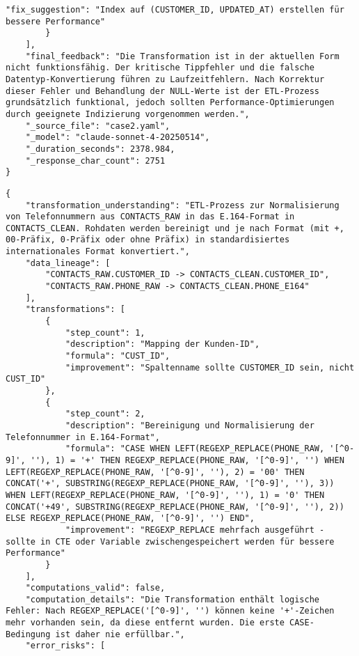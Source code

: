 \begin{lstlisting}[caption={Ausgabe: Claude Sonnet 4 Anwendungsfall 2 Robustheitsdurchlauf},label={claude_case2_prompt3}]
            "fix_suggestion": "Index auf (CUSTOMER_ID, UPDATED_AT) erstellen für bessere Performance"
        }
    ],
    "final_feedback": "Die Transformation ist in der aktuellen Form nicht funktionsfähig. Der kritische Tippfehler und die falsche Datentyp-Konvertierung führen zu Laufzeitfehlern. Nach Korrektur dieser Fehler und Behandlung der NULL-Werte ist der ETL-Prozess grundsätzlich funktional, jedoch sollten Performance-Optimierungen durch geeignete Indizierung vorgenommen werden.",
    "_source_file": "case2.yaml",
    "_model": "claude-sonnet-4-20250514",
    "_duration_seconds": 2378.984,
    "_response_char_count": 2751
}
\end{lstlisting}

\begin{lstlisting}[caption={Ausgabe: Claude Sonnet 4 Anwendungsfall 3 Hauptdurchlauf},label={claude_case3_prompt1}]
{
    "transformation_understanding": "ETL-Prozess zur Normalisierung von Telefonnummern aus CONTACTS_RAW in das E.164-Format in CONTACTS_CLEAN. Rohdaten werden bereinigt und je nach Format (mit +, 00-Präfix, 0-Präfix oder ohne Präfix) in standardisiertes internationales Format konvertiert.",
    "data_lineage": [
        "CONTACTS_RAW.CUSTOMER_ID -> CONTACTS_CLEAN.CUSTOMER_ID",
        "CONTACTS_RAW.PHONE_RAW -> CONTACTS_CLEAN.PHONE_E164"
    ],
    "transformations": [
        {
            "step_count": 1,
            "description": "Mapping der Kunden-ID",
            "formula": "CUST_ID",
            "improvement": "Spaltenname sollte CUSTOMER_ID sein, nicht CUST_ID"
        },
        {
            "step_count": 2,
            "description": "Bereinigung und Normalisierung der Telefonnummer in E.164-Format",
            "formula": "CASE WHEN LEFT(REGEXP_REPLACE(PHONE_RAW, '[^0-9]', ''), 1) = '+' THEN REGEXP_REPLACE(PHONE_RAW, '[^0-9]', '') WHEN LEFT(REGEXP_REPLACE(PHONE_RAW, '[^0-9]', ''), 2) = '00' THEN CONCAT('+', SUBSTRING(REGEXP_REPLACE(PHONE_RAW, '[^0-9]', ''), 3)) WHEN LEFT(REGEXP_REPLACE(PHONE_RAW, '[^0-9]', ''), 1) = '0' THEN CONCAT('+49', SUBSTRING(REGEXP_REPLACE(PHONE_RAW, '[^0-9]', ''), 2)) ELSE REGEXP_REPLACE(PHONE_RAW, '[^0-9]', '') END",
            "improvement": "REGEXP_REPLACE mehrfach ausgeführt - sollte in CTE oder Variable zwischengespeichert werden für bessere Performance"
        }
    ],
    "computations_valid": false,
    "computation_details": "Die Transformation enthält logische Fehler: Nach REGEXP_REPLACE('[^0-9]', '') können keine '+'-Zeichen mehr vorhanden sein, da diese entfernt wurden. Die erste CASE-Bedingung ist daher nie erfüllbar.",
    "error_risks": [

\end{lstlisting}
